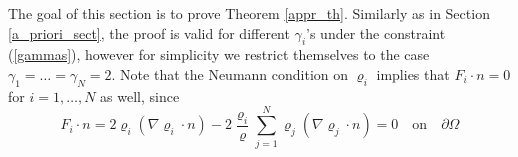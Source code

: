 \documentclass[11pt]{article}
\newcommand{\dd}{\mathrm{d}}
\newcommand{\ddiv}{\mathrm{div\,}}
\newtheorem{tw}{Theorem}
\numberwithin{equation}{section}
\numberwithin{tw}{section}
\begin{document}
The goal of this section is to prove Theorem \ref{appr_th}. Similarly as in Section \ref{a_priori_sect}, the proof is valid for different $\gamma_i$'s under the constraint (\ref{gammas}), however for simplicity we restrict themselves to the case $\gamma_1=\dots=\gamma_N=2$.
%
Note that the Neumann condition on $\varrho_i$ implies that $F_{i}\cdot n=0$ for $i=1,\dots,N$ as well, since
\[ F_i\cdot n = 2\varrho_i(\nabla\varrho_i\cdot n) - 2\frac{\varrho_i}{\varrho}\sum_{j=1}^N\varrho_j(\nabla\varrho_j\cdot n) = 0 \quad \text{on} \quad \partial\Omega \]

\smallskip 
\end{document}
